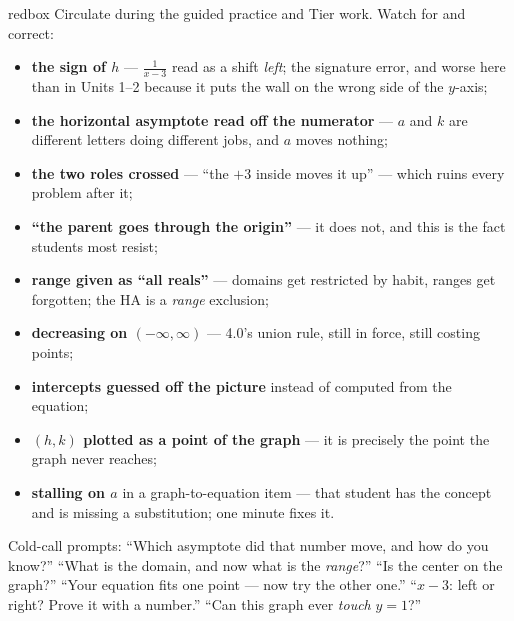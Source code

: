 \documentclass[10pt]{article}
\begin{document}
\begin{skillbox}{redbox}
Circulate during the guided practice and Tier work. Watch for and correct:
\begin{itemize}[leftmargin=1.2em, nosep]
  \item \textbf{the sign of $h$} --- $\frac{1}{x-3}$ read as a shift \emph{left}; the signature error, and worse here than in Units 1--2 because it puts the wall on the wrong side of the $y$-axis;
  \item \textbf{the horizontal asymptote read off the numerator} --- $a$ and $k$ are different letters doing different jobs, and $a$ moves nothing;
  \item \textbf{the two roles crossed} --- ``the $+3$ inside moves it up'' --- which ruins every problem after it;
  \item \textbf{``the parent goes through the origin''} --- it does not, and this is the fact students most resist;
  \item \textbf{range given as ``all reals''} --- domains get restricted by habit, ranges get forgotten; the HA is a \emph{range} exclusion;
  \item \textbf{decreasing on $(-\infty,\infty)$} --- 4.0's union rule, still in force, still costing points;
  \item \textbf{intercepts guessed off the picture} instead of computed from the equation;
  \item \textbf{$(h,k)$ plotted as a point of the graph} --- it is precisely the point the graph never reaches;
  \item \textbf{stalling on $a$} in a graph-to-equation item --- that student has the concept and is missing a substitution; one minute fixes it.
\end{itemize}
Cold-call prompts: ``Which asymptote did that number move, and how do you know?'' ``What is the domain,
and now what is the \emph{range}?'' ``Is the center on the graph?'' ``Your equation fits one point ---
now try the other one.'' ``$x-3$: left or right? Prove it with a number.'' ``Can this graph ever
\emph{touch} $y=1$?''
\end{skillbox}
\end{document}
